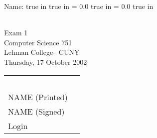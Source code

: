 
\pagestyle{myheadings}
{Name:\underline{\hspace{3in}}}
 true in
 true in
\oddsidemargin = 0.0 true in
\evensidemargin = 0.0 true in
\newcommand{\ul}{\underline}
\newcommand{\spa}{\hspace{.25in}}


{\Large
\begin{center}
\mbox{ }
\vspace{.1in} \\
    Exam 1 \\
    Computer Science 751\\ 
    Lehman College-- CUNY\\ 
    Thursday, 17 October 2002
\end{center}
}

{\large
\begin{center}
\begin{tabular}{ll}
\mbox{ }
\vspace{.5in} \\
NAME (Printed) & \ul{\hspace{3in}}\\ 
NAME (Signed) & \ul{\hspace{3in}} \\
Login & \ul{\hspace{3in}}\\
\end{tabular}
\end{center}
}

